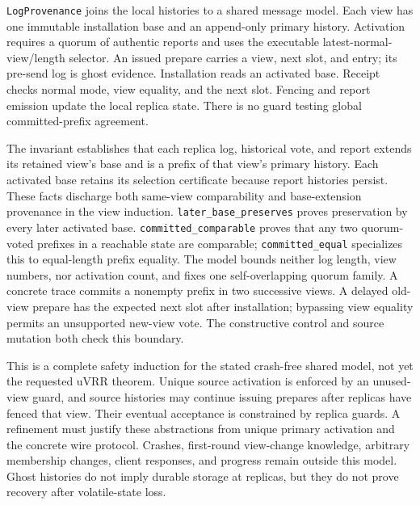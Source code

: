 \documentclass[10pt,journal,letterpaper]{IEEEtran}
\begin{document}
\texttt{LogProvenance} joins the local histories to a shared message model.
Each view has one immutable installation base and an append-only primary
history. Activation requires a quorum of authentic reports and uses the
executable latest-normal-view/length selector. An issued prepare carries a
view, next slot, and entry; its pre-send log is ghost evidence. Installation
reads an activated base. Receipt checks normal mode, view equality, and the
next slot. Fencing and report emission update the local replica state.
There is no guard testing global committed-prefix agreement.

The invariant establishes that each replica log, historical vote, and report
extends its retained view's base and is a prefix of that view's primary
history. Each activated base retains its selection certificate because report
histories persist. These facts discharge both same-view comparability and
base-extension provenance in the view induction.
\texttt{later\_base\_preserves} proves preservation by every later activated
base. \texttt{committed\_comparable} proves that any two quorum-voted prefixes
in a reachable state are comparable; \texttt{committed\_equal} specializes
this to equal-length prefix equality. The model bounds neither log length,
view numbers, nor activation count, and fixes one self-overlapping quorum
family. A concrete trace commits a nonempty prefix in two successive views.
A delayed old-view prepare has the expected next slot after installation;
bypassing view equality permits an unsupported new-view vote. The constructive
control and source mutation both check this boundary.

This is a complete safety induction for the stated crash-free shared model,
not yet the requested uVRR theorem. Unique source activation is enforced by an
unused-view guard, and source histories may continue issuing prepares after
replicas have fenced that view. Their eventual acceptance is constrained by
replica guards. A refinement must justify these abstractions from unique
primary activation and the concrete wire protocol. Crashes, first-round
view-change knowledge, arbitrary membership changes, client responses, and
progress remain outside this model. Ghost histories do not imply durable
storage at replicas, but they do not prove recovery after volatile-state loss.
\end{document}
